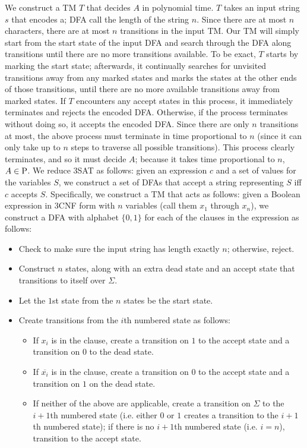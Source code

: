 \documentclass[solution, letterpaper]{cs121}
\begin{document}
\begin{solution}
\subsolution We construct a TM $T$ that decides $A$ in polynomial time.  $T$ takes an input string $s$ that encodes a; DFA call the length of the string $n$.  Since there are at most $n$ characters, there are at most $n$ transitions in the input TM.  Our TM will simply start from the start state of the input DFA and search through the DFA along transitions until there are no more transitions available.  To be exact, $T$ starts by marking the start state; afterwards, it continually searches for unvisited transitions away from any marked states and marks the states at the other ends of those transitions, until there are no more available transitions away from marked states.  If $T$ encounters any accept states in this process, it immediately terminates and rejects the encoded DFA.  Otherwise, if the process terminates without doing so, it accepts the encoded DFA.  Since there are only $n$ transitions at most, the above process must terminate in time proportional to $n$ (since it can only take up to $n$ steps to traverse all possible transitions).  This process clearly terminates, and so it must decide $A$; because it takes time proportional to $n$, $A \in \P$.
\subsolution We reduce 3SAT as follows: given an expression $c$ and a set of values for the variables $S$, we construct a set of DFAs that accept a string representing $S$ iff $c$ accepts $S$.  Specifically, we construct a TM that acts as follows: given a Boolean expression in 3CNF form with $n$ variables (call them $x_1$ through $x_n$), we construct a DFA with alphabet $\{0,1\}$ for each of the clauses in the expression as follows:
\begin{itemize}
	\setlength\itemsep{0cm}
	\item Check to make sure the input string has length exactly $n$; otherwise, reject.
	\item Construct $n$ states, along with an extra dead state and an accept state that transitions to itself over $\Sigma$.
	\item Let the $1$st state from the $n$ states be the start state.
	\item Create transitions from the $i$th numbered state as follows:
	\begin{itemize}
		\item If $x_i$ is in the clause, create a transition on $1$ to the accept state and a transition on $0$ to the dead state.
		\item If $\overline{x_i}$ is in the clause, create a transition on $0$ to the accept state and a transition on $1$ on the dead state.
		\item If neither of the above are applicable, create a transition on $\Sigma$ to the $i+1$th numbered state (i.e. either $0$ or $1$ creates a transition to the $i+1$th numbered state); if there is no $i+1$th numbered state (i.e. $i = n$), transition to the accept state.
	\end{itemize}
\end{itemize}


\end{solution}
\end{document}
